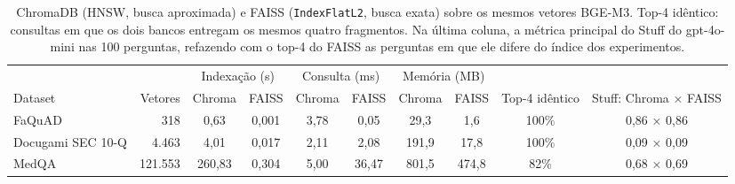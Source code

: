 \begin{table}[!t]
\centering
\footnotesize
\setlength{\tabcolsep}{4pt}
\caption{ChromaDB (HNSW, busca aproximada) e FAISS (\texttt{IndexFlatL2}, busca exata) sobre os mesmos vetores BGE-M3. Top-4 idêntico: consultas em que os dois bancos entregam os mesmos quatro fragmentos. Na última coluna, a métrica principal do Stuff do gpt-4o-mini nas 100 perguntas, refazendo com o top-4 do FAISS as perguntas em que ele difere do índice dos experimentos.}
\label{tab:bancos}
\begin{tabular}{lrcccccccc}
\toprule
 & & \multicolumn{2}{c}{Indexação (s)} & \multicolumn{2}{c}{Consulta (ms)} & \multicolumn{2}{c}{Memória (MB)} & & \\
\cmidrule(lr){3-4}\cmidrule(lr){5-6}\cmidrule(lr){7-8}
Dataset & Vetores & Chroma & FAISS & Chroma & FAISS & Chroma & FAISS & Top-4 idêntico & Stuff: Chroma × FAISS \\
\midrule
FaQuAD & 318 & 0,63 & 0,001 & 3,78 & 0,05 & 29,3 & 1,6 & 100\% & 0,86 × 0,86 \\
Docugami SEC 10-Q & 4.463 & 4,01 & 0,017 & 2,11 & 2,08 & 191,9 & 17,8 & 100\% & 0,09 × 0,09 \\
MedQA & 121.553 & 260,83 & 0,304 & 5,00 & 36,47 & 801,5 & 474,8 & 82\% & 0,68 × 0,69 \\
\bottomrule
\end{tabular}
\end{table}
